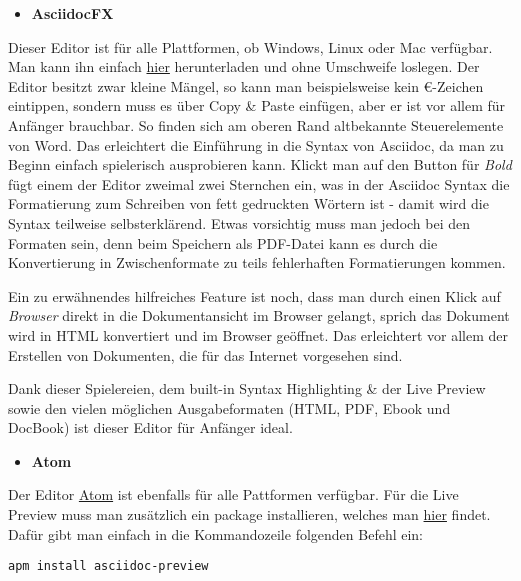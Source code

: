 \documentclass[11pt]{amsbook}
\begin{document}
\begin{itemize}

\item \textbf{AsciidocFX}

\end{itemize}


Dieser Editor ist für alle Plattformen, ob Windows, Linux oder Mac verfügbar. Man kann ihn einfach \href{http://asciidocfx.com/}{hier} herunterladen und ohne Umschweife loslegen. Der Editor besitzt zwar kleine Mängel, so kann man beispielsweise kein €-Zeichen eintippen, sondern muss es über Copy & Paste einfügen, aber er ist vor allem für Anfänger brauchbar. So finden sich am oberen Rand altbekannte Steuerelemente von Word. Das erleichtert die Einführung in die Syntax von Asciidoc, da man zu Beginn einfach spielerisch ausprobieren kann. Klickt man auf den Button für \emph{Bold} fügt einem der Editor zweimal zwei Sternchen ein, was in der Asciidoc Syntax die Formatierung zum Schreiben von fett gedruckten Wörtern ist - damit wird die Syntax teilweise selbsterklärend. Etwas vorsichtig muss man jedoch bei den Formaten sein, denn beim Speichern als PDF-Datei kann es durch die Konvertierung in Zwischenformate zu teils fehlerhaften Formatierungen kommen.


Ein zu erwähnendes hilfreiches Feature ist noch, dass man durch einen Klick auf \emph{Browser} direkt in die Dokumentansicht im Browser gelangt, sprich das Dokument wird in HTML konvertiert und im Browser geöffnet. Das erleichtert vor allem der Erstellen von Dokumenten, die für das Internet vorgesehen sind.


Dank dieser Spielereien, dem built-in Syntax Highlighting & der Live Preview sowie den vielen möglichen Ausgabeformaten (HTML, PDF, Ebook und DocBook) ist dieser Editor für Anfänger ideal.


\begin{itemize}

\item \textbf{Atom}

\end{itemize}


Der Editor \href{https://atom.io/}{Atom} ist ebenfalls für alle Pattformen verfügbar. Für die Live Preview muss man zusätzlich ein package installieren, welches man \href{https://atom.io/packages/asciidoc-preview}{hier} findet. Dafür gibt man einfach in die Kommandozeile folgenden Befehl ein:


\begin{verbatim}
apm install asciidoc-preview
\end{verbatim}
\end{document}
